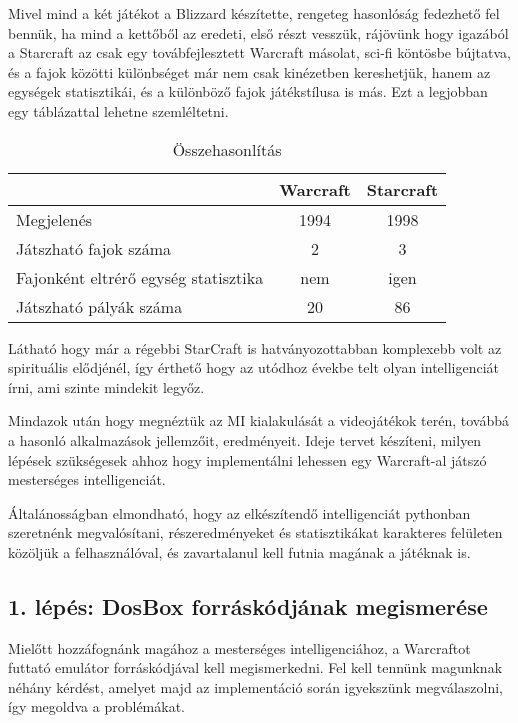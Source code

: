 Mivel mind a két játékot a Blizzard készítette, rengeteg hasonlóság fedezhető fel bennük, ha mind a kettőből az eredeti, első részt vesszük, rájövünk hogy igazából a Starcraft az csak egy továbfejlesztett Warcraft másolat, sci-fi köntösbe bújtatva, és a fajok közötti különbséget már nem csak kinézetben kereshetjük, hanem az egységek statisztikái, és a különböző fajok játékstílusa is más. Ezt a legjobban egy táblázattal lehetne szemléltetni.
\begin{table}[h]
    \centering
    \caption{Összehasonlítás}
    \label{tab:osszehasonlitas}
    \begin{tabular}{l|c|c|}
    ~ & Warcraft & Starcraft \\
    \hline
    Megjelenés & 1994 & 1998 \\
    Játszható fajok száma & 2 & 3 \\
    Fajonként eltrérő egység statisztika & nem & igen \\
    Játszható pályák száma & 20 & 86 \\
    \hline
    \end{tabular}
\end{table}

Látható hogy már a régebbi StarCraft is hatványozottabban komplexebb volt az spirituális elődjénél, így érthető hogy az utódhoz évekbe telt olyan intelligenciát írni, ami szinte mindekit legyőz.


Mindazok után hogy megnéztük az MI kialakulását a videojátékok terén, továbbá a hasonló alkalmazások jellemzőit, eredményeit. Ideje tervet készíteni, milyen lépések szükségesek ahhoz hogy implementálni lehessen egy Warcraft-al játszó mesterséges intelligenciát.

Általánosságban elmondható, hogy az elkészítendő intelligenciát pythonban szeretnénk megvalósítani, részeredményeket és statisztikákat karakteres felületen közöljük a felhasználóval, és zavartalanul kell futnia magának a játéknak is.

\subsection{1. lépés: DosBox forráskódjának megismerése}

Mielőtt hozzáfognánk magához a mesterséges intelligenciához, a Warcraftot futtató emulátor forráskódjával kell megismerkedni. Fel kell tennünk magunknak néhány kérdést, amelyet majd az implementáció során igyekszünk megválaszolni, így megoldva a problémákat.

